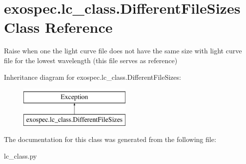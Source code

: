 \hypertarget{classexospec_1_1lc__class_1_1_different_file_sizes}{}\section{exospec.\+lc\+\_\+class.\+Different\+File\+Sizes Class Reference}
\label{classexospec_1_1lc__class_1_1_different_file_sizes}


Raise when one the light curve file does not have the same size with light curve file for the lowest wavelength (this file serves as reference)  


Inheritance diagram for exospec.\+lc\+\_\+class.\+Different\+File\+Sizes\+:\begin{figure}[H]
\begin{center}
\leavevmode
\includegraphics[height=2.000000cm]{classexospec_1_1lc__class_1_1_different_file_sizes}
\end{center}
\end{figure}


The documentation for this class was generated from the following file\+:\begin{DoxyCompactItemize}
\item 
lc\+\_\+class.\+py\end{DoxyCompactItemize}

